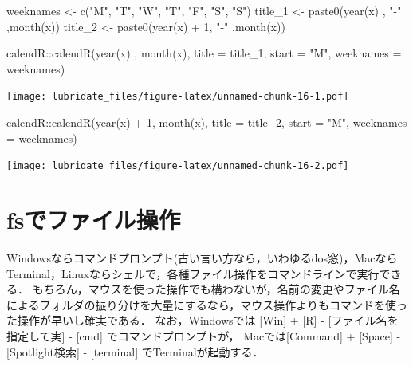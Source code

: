 \documentclass[
]{article}
\newenvironment{Shaded}{\begin{snugshade}}{\end{snugshade}}
\newcommand{\AttributeTok}[1]{\textcolor[rgb]{0.77,0.63,0.00}{#1}}
\newcommand{\DecValTok}[1]{\textcolor[rgb]{0.00,0.00,0.81}{#1}}
\newcommand{\FunctionTok}[1]{\textcolor[rgb]{0.00,0.00,0.00}{#1}}
\newcommand{\NormalTok}[1]{#1}
\newcommand{\OtherTok}[1]{\textcolor[rgb]{0.56,0.35,0.01}{#1}}
\newcommand{\SpecialCharTok}[1]{\textcolor[rgb]{0.00,0.00,0.00}{#1}}
\newcommand{\StringTok}[1]{\textcolor[rgb]{0.31,0.60,0.02}{#1}}
\begin{document}
\begin{Shaded}
\begin{Highlighting}[]
\NormalTok{weeknames }\OtherTok{\textless{}{-}}  \FunctionTok{c}\NormalTok{(}\StringTok{"M"}\NormalTok{, }\StringTok{"T"}\NormalTok{, }\StringTok{"W"}\NormalTok{, }\StringTok{"T"}\NormalTok{, }\StringTok{"F"}\NormalTok{, }\StringTok{"S"}\NormalTok{, }\StringTok{"S"}\NormalTok{)}
\NormalTok{title\_1 }\OtherTok{\textless{}{-}} \FunctionTok{paste0}\NormalTok{(}\FunctionTok{year}\NormalTok{(x)    , }\StringTok{"{-}"}\NormalTok{ ,}\FunctionTok{month}\NormalTok{(x))}
\NormalTok{title\_2 }\OtherTok{\textless{}{-}} \FunctionTok{paste0}\NormalTok{(}\FunctionTok{year}\NormalTok{(x) }\SpecialCharTok{+} \DecValTok{1}\NormalTok{, }\StringTok{"{-}"}\NormalTok{ ,}\FunctionTok{month}\NormalTok{(x))}

\NormalTok{calendR}\SpecialCharTok{::}\FunctionTok{calendR}\NormalTok{(}\FunctionTok{year}\NormalTok{(x)    , }\FunctionTok{month}\NormalTok{(x), }\AttributeTok{title =}\NormalTok{ title\_1, }\AttributeTok{start =} \StringTok{"M"}\NormalTok{, }\AttributeTok{weeknames =}\NormalTok{ weeknames)}
\end{Highlighting}
\end{Shaded}

\texttt{[image: lubridate\_files/figure-latex/unnamed-chunk-16-1.pdf]}

\begin{Shaded}
\begin{Highlighting}[]
\NormalTok{calendR}\SpecialCharTok{::}\FunctionTok{calendR}\NormalTok{(}\FunctionTok{year}\NormalTok{(x) }\SpecialCharTok{+} \DecValTok{1}\NormalTok{, }\FunctionTok{month}\NormalTok{(x), }\AttributeTok{title =}\NormalTok{ title\_2, }\AttributeTok{start =} \StringTok{"M"}\NormalTok{, }\AttributeTok{weeknames =}\NormalTok{ weeknames)}
\end{Highlighting}
\end{Shaded}

\texttt{[image: lubridate\_files/figure-latex/unnamed-chunk-16-2.pdf]}

\hypertarget{fs}{%
\section{fsでファイル操作}\label{fs}}

Windowsならコマンドプロンプト(古い言い方なら，いわゆるdos窓)，MacならTerminal，Linuxならシェルで，各種ファイル操作をコマンドラインで実行できる．
もちろん，マウスを使った操作でも構わないが，名前の変更やファイル名によるフォルダの振り分けを大量にするなら，マウス操作よりもコマンドを使った操作が早いし確実である．
なお，Windowsでは {[}Win{]} + {[}R{]} - {[}ファイル名を指定して実{]} - {[}cmd{]} でコマンドプロンプトが，
Macでは{[}Command{]} + {[}Space{]} - {[}Spotlight検索{]} - {[}terminal{]} でTerminalが起動する．
\end{document}
